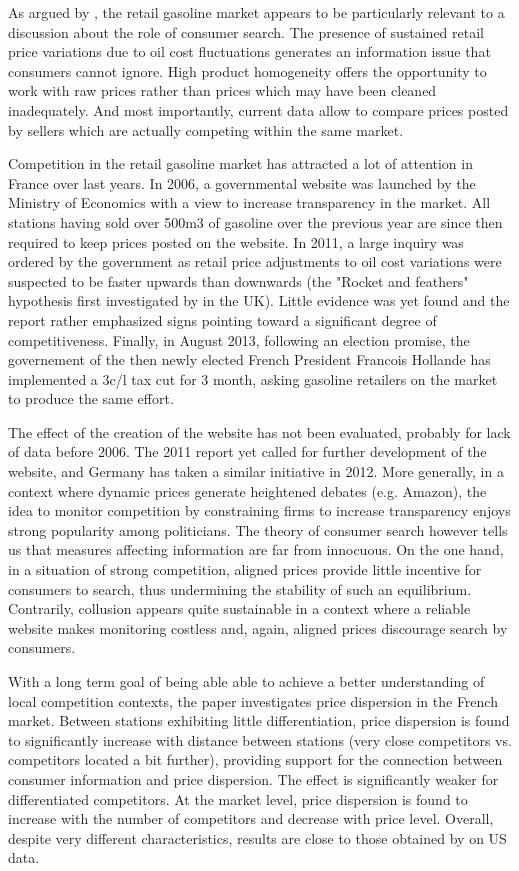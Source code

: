 \documentclass[11pt]{article}
\begin{document}
As argued by \cite{TAP11}, the retail gasoline market appears to be particularly relevant to a discussion about the role of consumer search. The presence of sustained retail price variations due to oil cost fluctuations generates an information issue that consumers cannot ignore. High product homogeneity offers the opportunity to work with raw prices rather than prices which may have been cleaned inadequately. And most importantly, current data allow to compare prices posted by sellers which are actually competing within the same market.

Competition in the retail gasoline market has attracted a lot of attention in France over last years. In 2006, a governmental website was launched by the Ministry of Economics with a view to increase transparency in the market. All stations having sold over 500m3 of gasoline over the previous year are since then required to keep prices posted on the website. In 2011, a large inquiry was ordered by the government as retail price adjustments to oil cost variations were suspected to be faster upwards than downwards (the "Rocket and feathers" hypothesis first investigated by \cite{BAC91} in the UK). Little evidence was yet found and the report rather emphasized signs pointing toward a significant degree of competitiveness. Finally, in August 2013, following an election promise, the governement of the then newly elected French President Francois Hollande has implemented a 3c/l tax cut for 3 month, asking gasoline retailers on the market to produce the same effort.

The effect of the creation of the website has not been evaluated, probably for lack of data before 2006. The 2011 report yet called for further development of the website, and Germany has taken a similar initiative in 2012. More generally, in a context where dynamic prices generate heightened debates (e.g. Amazon), the idea to monitor competition by constraining firms to increase transparency enjoys strong popularity among politicians. The theory of consumer search however tells us that measures affecting information are far from innocuous. On the one hand, in a situation of strong competition, aligned prices provide little incentive for consumers to search, thus undermining the stability of such an equilibrium. Contrarily, collusion appears quite sustainable in a context where a reliable website makes monitoring costless and, again, aligned prices discourage search by consumers.

With a long term goal of being able able to achieve a better understanding of local competition contexts, the paper investigates price dispersion in the French market. Between stations exhibiting little differentiation, price dispersion is found to significantly increase with distance between stations (very close competitors vs. competitors located a bit further), providing support for the connection between consumer information and price dispersion. The effect is significantly weaker for differentiated competitors. At the market level, price dispersion is found to increase with the number of competitors and decrease with price level. Overall, despite very different characteristics, results are close to those obtained by \cite{TAP11} on US data.
\end{document}
